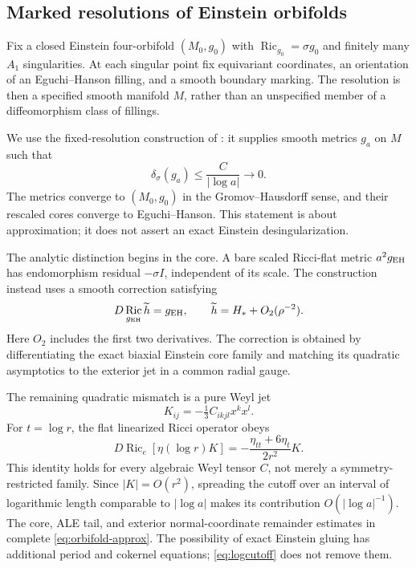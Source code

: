 \documentclass[11pt,a4paper]{article}
\theoremstyle{definition}\newtheorem{definition}[theorem]{Definition}
\theoremstyle{remark}\newtheorem{remark}[theorem]{Remark}
\DeclareMathOperator{\Ric}{Ric}
\begin{document}
\subsection{Marked resolutions of Einstein orbifolds}
Fix a closed Einstein four-orbifold $(M_0,g_0)$ with $\Ric_{g_0}=\sigma g_0$ and finitely many $A_1$ singularities. At each singular point fix equivariant coordinates, an orientation of an Eguchi--Hanson filling, and a smooth boundary marking. The resolution is then a specified smooth manifold $M$, rather than an unspecified member of a diffeomorphism class of fillings.

We use the fixed-resolution construction of \cite{source-integrated,source-construction}: it supplies smooth metrics $g_a$ on $M$ such that
\begin{equation}\label{eq:orbifold-approx}
 \delta_\sigma(g_a)\le\frac{C}{|\log a|}\longrightarrow0.
\end{equation}
The metrics converge to $(M_0,g_0)$ in the Gromov--Hausdorff sense, and their rescaled cores converge to Eguchi--Hanson. This statement is about approximation; it does not assert an exact Einstein desingularization.

The analytic distinction begins in the core. A bare scaled Ricci-flat metric $a^2g_{\rm EH}$ has endomorphism residual $-\sigma I$, independent of its scale. The construction instead uses a smooth correction satisfying
\begin{equation}\label{eq:EH-correction}
 D\Ric_{g_{\rm EH}}\widetilde h=g_{\rm EH},\qquad
 \widetilde h=H_*+O_2(\rho^{-2}).
\end{equation}
Here $O_2$ includes the first two derivatives. The correction is obtained by differentiating the exact biaxial Einstein core family and matching its quadratic asymptotics to the exterior jet in a common radial gauge.

The remaining quadratic mismatch is a pure Weyl jet
\[
 K_{ij}=-\tfrac13 C_{ikjl}x^kx^l.
\]
For $t=\log r$, the flat linearized Ricci operator obeys
\begin{equation}\label{eq:logcutoff}
 D\Ric_e[\eta(\log r)K]
       =-\frac{\eta_{tt}+6\eta_t}{2r^2}K.
\end{equation}
This identity holds for every algebraic Weyl tensor $C$, not merely a symmetry-restricted family. Since $|K|=O(r^2)$, spreading the cutoff over an interval of logarithmic length comparable to $|\log a|$ makes its contribution $O(|\log a|^{-1})$. The core, ALE tail, and exterior normal-coordinate remainder estimates in \cite{source-construction} complete \eqref{eq:orbifold-approx}. The possibility of exact Einstein gluing has additional period and cokernel equations; \eqref{eq:logcutoff} does not remove them.
\end{document}
